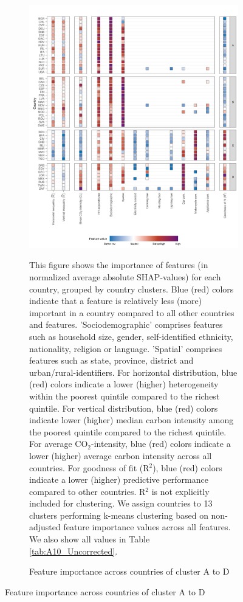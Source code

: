 \clearpage
\begin{figure}[ht!]
    \centering
    \caption{Feature importance across countries by cluster (non-adjusted)}\label{fig:fig_4_uncorrected}
    \begin{subfigure}[b]{\textwidth}
    \centering
    \caption{Feature importance across countries of cluster A to D}\label{fig:fig_4_1_uncorrected}
    \includegraphics{1_Figures/Figure 4/Figure_4_Uncorrected_1.jpg}
     \begin{subcaption2}
    This figure shows the importance of features (in normalized average absolute SHAP-values) for each country, grouped by country clusters. Blue (red) colors indicate that a feature is relatively less (more) important in a country compared to all other countries and features. 'Sociodemographic' comprises features such as household size, gender, self-identified ethnicity, nationality, religion or language. 'Spatial' comprises features such as state, province, district and urban/rural-identifiers. For horizontal distribution, blue (red) colors indicate a lower (higher) heterogeneity within the poorest quintile compared to the richest quintile. For vertical distribution, blue (red) colors indicate lower (higher) median carbon intensity among the poorest quintile compared to the richest quintile. For average CO$_{2}$-intensity, blue (red) colors indicate a lower (higher) average carbon intensity across all countries. For goodness of fit (R$^{2}$), blue (red) colors indicate a lower (higher) predictive performance compared to other countries. R$^{2}$ is not explicitly included for clustering.
    We assign countries to 13 clusters performing k-means clustering based on non-adjusted feature importance values across all features. We also show all values in Table \ref{tab:A10_Uncorrected}.
    \end{subcaption2}
    \end{subfigure}
\end{figure}
